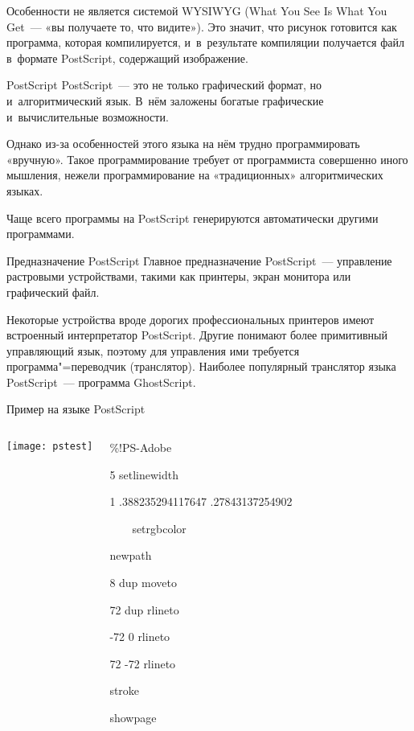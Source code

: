 
\begin{frame}{Особенности }
 \alert{не} является системой WYSIWYG (What You See Is What
You Get~— «вы получаете то, что видите»). Это значит, что рисунок готовится как
программа, которая компилируется, и~в~результате компиляции получается файл
в~формате PostScript, содержащий изображение.
\end{frame}


\begin{frame}{PostScript}
PostScript~— это не только графический формат, но и~алгоритмический язык. В~нём
заложены богатые графические и~вычислительные возможности.

Однако из-за особенностей этого языка на нём трудно программировать «вручную».
Такое программирование требует от программиста совершенно иного мышления,
нежели программирование на «традиционных» алгоритмических языках.

Чаще всего программы на PostScript генерируются автоматически другими
программами.
\end{frame}


\begin{frame}{Предназначение PostScript}
Главное предназначение PostScript~— управление растровыми устройствами, такими
как принтеры, экран монитора или графический файл.

Некоторые устройства вроде дорогих профессиональных принтеров имеют встроенный
интерпретатор PostScript. Другие понимают более примитивный управляющий язык,
поэтому для управления ими требуется программа"=переводчик (транслятор).
Наиболее популярный транслятор языка PostScript~— программа GhostScript.
\end{frame}


\begin{frame}{Пример на языке PostScript}
\begin{columns}
\texttt{[image: pstest]}
\begin{programlisting}
\%!PS-Adobe\par
\leavevmode\par
5 setlinewidth\par
1 .388235294117647 .27843137254902\par
~~~~setrgbcolor\par
\leavevmode\par
newpath\par
8 dup moveto\par
72 dup rlineto\par
-72 0 rlineto\par
72 -72 rlineto\par
stroke\par
\leavevmode\par
showpage
\end{programlisting}
\end{columns}
\end{frame}

